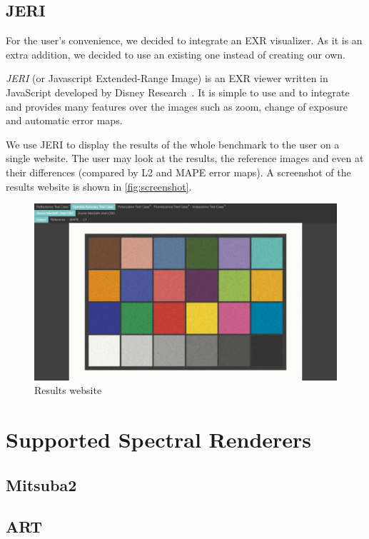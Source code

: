 \subsection{JERI}

For the user's convenience, we decided to integrate an EXR visualizer. As it is an extra addition, we decided to use an existing one instead of creating our own.

\emph{JERI} (or Javascript Extended-Range Image) is an EXR viewer written in JavaScript developed by Disney Research~\cite{jeriWeb}. It is simple to use and to integrate and provides many features over the images such as zoom, change of exposure and automatic error maps.

We use JERI to display the results of the whole benchmark to the user on a single website. The user may look at the results, the reference images and even at their differences (compared by L2 and MAPE error maps). A screenshot of the results website is shown in \autoref{fig:screenshot}.

\begin{figure}
	\centering
	\includegraphics[width=\linewidth]{img/screenshot.png}
	\caption{Results website}
	\label{fig:screenshot}
\end{figure}

\section{Supported Spectral Renderers}

\subsection{Mitsuba2}

\subsection{ART}


